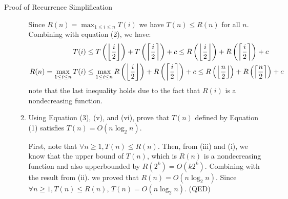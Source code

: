 \documentclass{article}
\begin{document}
\begin{section}{Proof of Recurrence Simplification}
\begin{enumerate}
\begin{enumerate}
        Since $R(n) = \max_{1 \leq i \leq n} T(i)$ we have $T(n) \leq R(n)$ for all $n$. Combining with equation (2), we have:
        \begin{align*}
            T(i) &\leq T\pbracket{\floor*{\frac{i}{2}}} + T\pbracket{\ceil*{\frac{i}{2}}} + c \leq  R\pbracket{\floor*{\frac{i}{2}}} + R\pbracket{\ceil*{\frac{i}{2}}} + c \\
            R(n) = \max_{1 \leq i \leq n} T(i) &\leq \max_{1 \leq i \leq n} R\pbracket{\floor*{\frac{i}{2}}} + R\pbracket{\ceil*{\frac{i}{2}}} + c \leq R\pbracket{\floor*{\frac{n}{2}}} + R\pbracket{\ceil*{\frac{n}{2}}} + c
        \end{align*}
        note that the last inequality holds due to the fact that $R(i)$ is a nondecreasing function.
        
        \item Using Equation (3), (v), and (vi), prove that $T(n)$ defined by Equation (1) satisfies $T(n) = O(n \log_2 n)$.
        
        First, note that $\forall n \geq  1, T(n) \leq R(n)$. Then, from (iii) and (i), we know that the upper bound of $T(n)$, which is $R(n)$ is a nondecreasing function and also upperbounded by $R(2^k) = O(k2^k)$. Combining with the result from (ii). we proved that $R(n) = O(n \log_2 n)$. Since $\forall n \geq 1, T(n) \leq R(n)$, $T(n) = O(n \log_2 n)$. (QED)
    \end{enumerate}
\end{enumerate}
\end{section}
\end{document}

